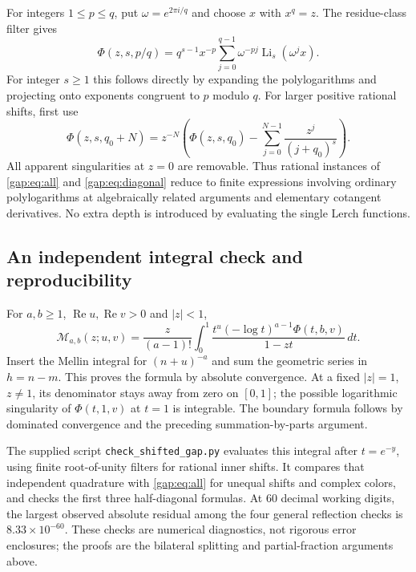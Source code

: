 For integers $1\leq p\leq q$, put $\omega=e^{2\pi i/q}$ and choose
$x$ with $x^q=z$. The residue-class filter gives
\begin{equation}\label{gap:eq:rational-filter}
 \Phi(z,s,p/q)=q^{s-1}x^{-p}
    \sum_{j=0}^{q-1}\omega^{-pj}
                    \operatorname{Li}_s(\omega^j x).
\end{equation}
For integer $s\geq1$ this follows directly by expanding the
polylogarithms and projecting onto exponents congruent to $p$ modulo
$q$. For larger positive rational shifts, first use
\[
 \Phi(z,s,q_0+N)=z^{-N}
 \left(\Phi(z,s,q_0)-\sum_{j=0}^{N-1}\frac{z^j}{(j+q_0)^s}\right).
\]
All apparent singularities at $z=0$ are removable. Thus rational
instances of \eqref{gap:eq:all} and \eqref{gap:eq:diagonal} reduce to
finite expressions involving ordinary polylogarithms at algebraically
related arguments and elementary cotangent derivatives. No extra
depth is introduced by evaluating the single Lerch functions.

\subsection{An independent integral check and reproducibility}

For $a,b\geq1$, $\operatorname{Re}u,\operatorname{Re}v>0$ and
$|z|<1$,
\begin{equation}\label{gap:eq:integral}
 \mathcal M_{a,b}(z;u,v)
 =\frac z{(a-1)!}\int_0^1
       \frac{t^u(-\log t)^{a-1}\Phi(t,b,v)}{1-zt}\,dt.
\end{equation}
Insert the Mellin integral for $(n+u)^{-a}$ and sum the geometric
series in $h=n-m$. This proves the formula by absolute convergence.
At a fixed $|z|=1$, $z\ne1$, its denominator stays away from zero on
$[0,1]$; the possible logarithmic singularity of $\Phi(t,1,v)$ at
$t=1$ is integrable. The boundary formula follows by dominated
convergence and the preceding summation-by-parts argument.

The supplied script \texttt{check\_shifted\_gap.py} evaluates this
integral after $t=e^{-y}$, using finite root-of-unity filters for
rational inner shifts. It compares that independent quadrature with
\eqref{gap:eq:all} for unequal shifts and complex colors, and checks
the first three half-diagonal formulas. At 60 decimal working digits,
the largest observed absolute residual among the four general
reflection checks is $8.33\times10^{-60}$. These checks are numerical
diagnostics, not rigorous error enclosures; the proofs are the
bilateral splitting and partial-fraction arguments above.

